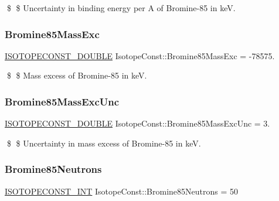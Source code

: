 \$ \$ Uncertainty in binding energy per A of Bromine-\/85 in keV. \mbox{\label{group___isotope_const-_bromine-_br85_ga777187a8222623fea7b866a7cd621fbd}} 
\subsubsection{\texorpdfstring{Bromine85\+Mass\+Exc}{Bromine85MassExc}}
{\footnotesize\ttfamily \mbox{\hyperlink{group___isotope_const-_macros_ga8f45a7272ce02c0b4c65c44636ed719a}{I\+S\+O\+T\+O\+P\+E\+C\+O\+N\+S\+T\+\_\+\+D\+O\+U\+B\+LE}} Isotope\+Const\+::\+Bromine85\+Mass\+Exc = -\/78575.}

\$ \$ Mass excess of Bromine-\/85 in keV. \mbox{\label{group___isotope_const-_bromine-_br85_ga2b255ac118184ff92d8fa53b2350c1c7}} 
\subsubsection{\texorpdfstring{Bromine85\+Mass\+Exc\+Unc}{Bromine85MassExcUnc}}
{\footnotesize\ttfamily \mbox{\hyperlink{group___isotope_const-_macros_ga8f45a7272ce02c0b4c65c44636ed719a}{I\+S\+O\+T\+O\+P\+E\+C\+O\+N\+S\+T\+\_\+\+D\+O\+U\+B\+LE}} Isotope\+Const\+::\+Bromine85\+Mass\+Exc\+Unc = 3.}

\$ \$ Uncertainty in mass excess of Bromine-\/85 in keV. \mbox{\label{group___isotope_const-_bromine-_br85_gac13fc469cffe3ae52f69cb1b81588433}} 
\subsubsection{\texorpdfstring{Bromine85\+Neutrons}{Bromine85Neutrons}}
{\footnotesize\ttfamily \mbox{\hyperlink{group___isotope_const-_macros_ga5f18360b3e99483a35c32d789e62621c}{I\+S\+O\+T\+O\+P\+E\+C\+O\+N\+S\+T\+\_\+\+I\+NT}} Isotope\+Const\+::\+Bromine85\+Neutrons = 50}


